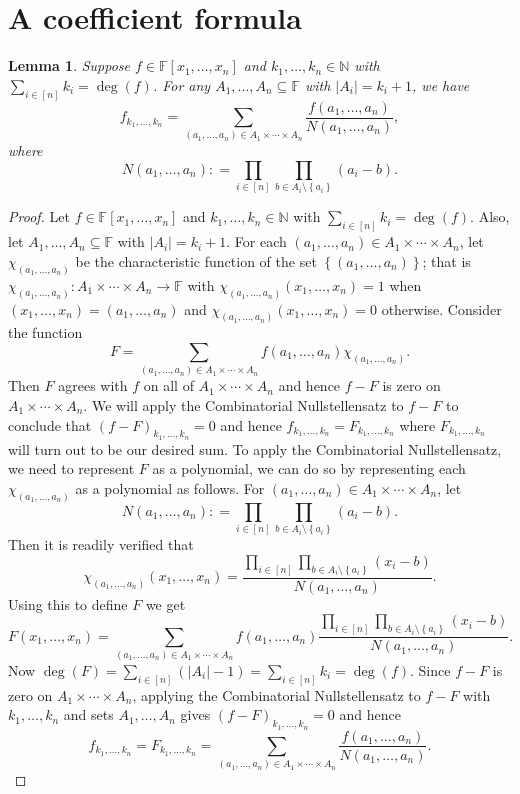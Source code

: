 \documentclass{tufte-book} %
\theoremstyle{plain}
\newtheorem{lemma}{Lemma}
\newcommand{\set}[1]{\left\{ #1 \right\}}
\newcommand{\card}[1]{\left|#1\right|}
\newcommand{\func}[3]{#1\colon #2 \rightarrow #3}
\newcommand{\irange}[1]{\left[#1\right]}
\newcommand{\DefinedAs}{\mathrel{\mathop:}=}
\newcommand{\IN}{\mathbb{N}}
\begin{document}
\section{A coefficient formula}
\begin{lemma}
Suppose $f \in \mathbb{F}[x_1, \ldots, x_n]$ and $k_1, \ldots, k_n \in \IN$ with $\sum_{i \in \irange{n}} k_i = \deg(f)$.  For any $A_1, \ldots, A_n \subseteq \mathbb{F}$ with $\card{A_i} = k_i + 1$, we have
\[f_{k_1, \ldots, k_n} = \sum_{(a_1, \ldots, a_n) \in A_1 \times \cdots \times A_n} \frac{f(a_1, \ldots, a_n)}{N(a_1, \ldots, a_n)},\]
where
\[N(a_1, \ldots, a_n) \DefinedAs \prod_{i \in \irange{n}} \prod_{b \in A_i \setminus \set{a_i}} (a_i - b).\]
\end{lemma}
\begin{proof}
Let $f \in \mathbb{F}[x_1, \ldots, x_n]$ and $k_1, \ldots, k_n \in \IN$ with $\sum_{i \in \irange{n}} k_i = \deg(f)$. Also, let $A_1, \ldots, A_n \subseteq \mathbb{F}$ with $\card{A_i} = k_i + 1$.  For each $(a_1, \ldots, a_n) \in A_1 \times \cdots \times A_n$, let $\chi_{(a_1, \ldots, a_n)}$ be the characteristic function of the set $\set{(a_1, \ldots, a_n)}$; that is $\func{\chi_{(a_1, \ldots, a_n)}}{A_1 \times \cdots \times A_n}{\mathbb{F}}$ with $\chi_{(a_1, \ldots, a_n)}(x_1, \ldots, x_n) = 1$ when $(x_1, \ldots, x_n) = (a_1, \ldots, a_n)$ and $\chi_{(a_1, \ldots, a_n)}(x_1, \ldots, x_n) = 0$ otherwise.  Consider the function
\[F = \sum_{(a_1, \ldots, a_n) \in A_1 \times \cdots \times A_n} f(a_1, \ldots, a_n)\chi_{(a_1, \ldots, a_n)}.\]
Then $F$ agrees with $f$ on all of $A_1 \times \cdots \times A_n$ and hence $f - F$ is zero on $A_1 \times \cdots \times A_n$.  We will apply the Combinatorial Nullstellensatz to $f - F$ to conclude that $(f-F)_{k_1, \ldots, k_n} = 0$ and hence $f_{k_1, \ldots, k_n} = F_{k_1, \ldots, k_n}$ where  $F_{k_1, \ldots, k_n}$ will turn out to be our desired sum.  To apply the Combinatorial Nullstellensatz, we need to represent $F$ as a polynomial, we can do so by representing each $\chi_{(a_1, \ldots, a_n)}$ as a polynomial as follows.  For $(a_1, \ldots, a_n) \in A_1 \times \cdots \times A_n$, let 
\[N(a_1, \ldots, a_n) \DefinedAs \prod_{i \in \irange{n}} \prod_{b \in A_i \setminus \set{a_i}} (a_i - b).\]
\noindent Then it is readily verified that
\[\chi_{(a_1, \ldots, a_n)}(x_1, \ldots, x_n) = \frac{\prod_{i \in \irange{n}} \prod_{b \in A_i \setminus \set{a_i}} (x_i - b)}{N(a_1, \ldots, a_n)}.\]
\noindent Using this to define $F$ we get 
\[F(x_1, \ldots, x_n) = \sum_{(a_1, \ldots, a_n) \in A_1 \times \cdots \times A_n} f(a_1, \ldots, a_n)\frac{\prod_{i \in \irange{n}} \prod_{b \in A_i \setminus \set{a_i}} (x_i - b)}{N(a_1, \ldots, a_n)}.\]
Now  $\deg(F) = \sum_{i \in \irange{n}} (|A_i| - 1) = \sum_{i \in \irange{n}} k_i = \deg(f)$.  Since $f - F$ is zero on $A_1 \times \cdots \times A_n$, applying the Combinatorial Nullstellensatz to $f - F$ with $k_1, \ldots, k_n$ and sets $A_1, \ldots, A_n$ gives $(f-F)_{k_1, \ldots, k_n} = 0$ and hence 
\[f_{k_1, \ldots, k_n} = F_{k_1, \ldots, k_n} = \sum_{(a_1, \ldots, a_n) \in A_1 \times \cdots \times A_n} \frac{f(a_1, \ldots, a_n)}{N(a_1, \ldots, a_n)}.\]
\end{proof}
\end{document}
